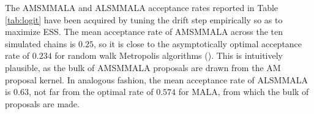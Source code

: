 \documentclass[twoside,11pt]{article}
\begin{document}
The AMSMMALA and ALSMMALA acceptance rates reported in Table \ref{tab:logit} have been acquired by tuning the drift step 
empirically so as to maximize ESS. The mean acceptance rate of AMSMMALA across the ten simulated chains is $0.25$, so it is 
close to the asymptotically optimal acceptance rate of $0.234$ for random walk Metropolis algorithms 
(\cite{rob_gel_gil__wea}). This is intuitively plausible, as the bulk of AMSMMALA proposals are drawn from the AM proposal 
kernel. In analogous fashion, the mean acceptance rate of ALSMMALA is $0.63$, not far from the optimal rate of $0.574$ for
MALA, from which the bulk of proposals are made.

\begin{figure}[t]
	\centering
	 \\
	 \\

\end{figure}
\end{document}
